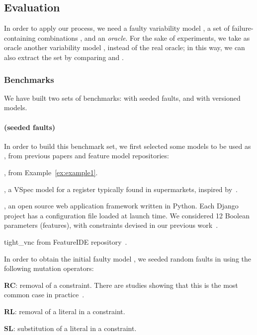 \begin{tikzborder}{\cite{Gargantini16:validation}}
\begin{tikzborder}{\cite{gargantini_combinatorial_2017}}
\begin{tikzborder}{\cite{gargantini_combinatorial_2017}}
\begin{tikzborder}{\cite{garn2019}}
\begin{tikzborder}{\cite{arcaini2019achieving}}
\begin{tikzborder}{\cite{arcaini2019varivolution}}
		\subsection{Evaluation}\label{sec:repairevaluation}
		
		\bb In order to apply our process, we need a faulty variability model \m, a set of failure-containing combinations \fccSet, and an {\it oracle}. For the sake of experiments, we take as oracle another variability model \mO, instead of the real oracle; in this way, we can also extract the set \fccSet by comparing \m and \mO. \be
		
		\subsubsection{Benchmarks}
		
		\bb We have built two sets of benchmarks: \benchMut with seeded faults, and \benchReal with versioned models.\be
		
		\paragraph{\benchMut (seeded faults)} 
		\bb In order to build this benchmark set, we first selected some models to be used as \mO, from previous papers and feature model repositories:
		\begin{compactitem}
			\item \exampleM, from Example~\ref{ex:example1}.
			\item \register, a VSpec model for a register typically found in supermarkets, inspired by~\cite{Shimbara2015}.
			\item \django, an open source web application framework written in Python. Each Django project has a configuration file loaded at launch time. We considered 12 Boolean parameters (features), with constraints devised in our previous work~\cite{gargantini_combinatorial_2017}.
			\item \textsf{tight\_vnc} from FeatureIDE repository~\cite{FeatureIDEbook}.
		\end{compactitem}
		In order to obtain the initial faulty model \m, we seeded random faults in \mO using the following mutation operators:
		\begin{compactitem}
			\item \textbf{\textsf{RC}}: removal of a constraint. There are studies showing that this is the most common case in practice~\cite{lotufo_evolution_2010}.
			\item \textbf{\textsf{RL}}: removal of a literal in a constraint.
			\item \textbf{\textsf{SL}}: substitution of a literal in a constraint.
		\end{compactitem}
		

\end{tikzborder}
\end{tikzborder}
\end{tikzborder}
\end{tikzborder}
\end{tikzborder}
\end{tikzborder}
